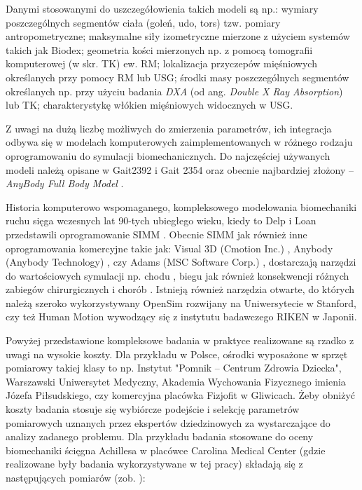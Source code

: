 Danymi stosowanymi do uszczegółowienia takich modeli są np.: wymiary poszczególnych segmentów ciała (goleń, udo, tors) tzw. pomiary antropometryczne; maksymalne siły izometryczne mierzone z użyciem systemów takich jak Biodex; geometria kości mierzonych np. z pomocą tomografii komputerowej (w skr. TK) ew. RM; lokalizacja przyczepów mięśniowych określanych przy pomocy RM lub USG; środki masy poszczególnych segmentów określanych np. przy użyciu badania \textit{DXA} (od ang. \textit{Double X Ray Absorption}) lub TK; charakterystykę włókien mięśniowych widocznych w USG.

Z uwagi na dużą liczbę możliwych do zmierzenia parametrów, ich integracja odbywa się w modelach komputerowych zaimplementowanych w różnego rodzaju oprogramowaniu do symulacji biomechanicznych. Do najczęściej używanych modeli należą opisane w \cite{John2013} Gait2392 i Gait 2354 oraz obecnie najbardziej złożony -- \textit{AnyBody Full Body Model} \cite{Bassani2017}. 

Historia komputerowo wspomaganego, kompleksowego modelowania biomechaniki ruchu sięga wczesnych lat 90-tych ubiegłego wieku, kiedy to Delp i Loan przedstawili oprogramowanie SIMM \cite{Delp1990}. Obecnie SIMM jak również inne oprogramowania komercyjne takie jak: Visual 3D (Cmotion Inc.) \cite{Visual3D}, Anybody (Anybody Technology) \cite{AnyBody}, czy Adams (MSC Software Corp.) \cite{Adams}, dostarczają narzędzi do wartościowych symulacji np. chodu \cite{Steele2010}, biegu \cite{Hamner2010} jak również konsekwencji różnych zabiegów chirurgicznych \cite{Gomes2013} i chorób \cite{Shao2009}. Istnieją również narzędzia otwarte, do których należą szeroko wykorzystywany OpenSim \cite{Delp2007} rozwijany na Uniwersytecie w Stanford, czy też Human Motion \cite{Riken} wywodzący się z instytutu badawczego RIKEN w Japonii.

Powyżej przedstawione kompleksowe badania w praktyce realizowane są rzadko z uwagi na wysokie koszty. Dla przykładu w Polsce, ośrodki wyposażone w sprzęt pomiarowy takiej klasy to np. Instytut "Pomnik – Centrum Zdrowia Dziecka", Warszawski Uniwersytet Medyczny, Akademia Wychowania Fizycznego imienia Józefa Piłsudskiego, czy komercyjna placówka Fizjofit w Gliwicach. Żeby obniżyć koszty badania stosuje się wybiórcze podejście i selekcję parametrów pomiarowych uznanych przez ekspertów dziedzinowych za wystarczające do analizy zadanego problemu. Dla przykładu badania stosowane do oceny biomechaniki ścięgna Achillesa w placówce Carolina Medical Center (gdzie realizowane były badania wykorzystywane w tej pracy) składają się z następujących pomiarów (zob. \cite{CMC}):

